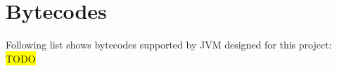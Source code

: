 \chapter{Bytecodes}\label{Appx:Bytecodes}
Following list shows bytecodes supported by JVM designed for this project:
\colorbox{yellow}{TODO}

